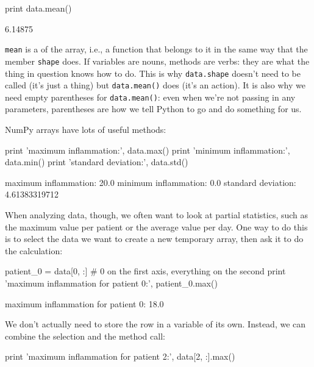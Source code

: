 \documentclass{book}
\begin{document}
\begin{VerbIn}
print data.mean()
\end{VerbIn}

\begin{VerbOut}
6.14875
\end{VerbOut}

\texttt{mean} is a  of the array, i.e., a
function that belongs to it in the same way that the member
\texttt{shape} does. If variables are nouns, methods are verbs: they are
what the thing in question knows how to do. This is why
\texttt{data.shape} doesn't need to be called (it's just a thing) but
\texttt{data.mean()} does (it's an action). It is also why we need empty
parentheses for \texttt{data.mean()}: even when we're not passing in any
parameters, parentheses are how we tell Python to go and do something
for us.

NumPy arrays have lots of useful methods:

\begin{VerbIn}
print 'maximum inflammation:', data.max()
print 'minimum inflammation:', data.min()
print 'standard deviation:', data.std()
\end{VerbIn}

\begin{VerbOut}
maximum inflammation: 20.0
minimum inflammation: 0.0
standard deviation: 4.61383319712
\end{VerbOut}

When analyzing data, though, we often want to look at partial
statistics, such as the maximum value per patient or the average value
per day. One way to do this is to select the data we want to create a
new temporary array, then ask it to do the calculation:

\begin{VerbIn}
patient_0 = data[0, :] # 0 on the first axis, everything on the second
print 'maximum inflammation for patient 0:', patient_0.max()
\end{VerbIn}

\begin{VerbOut}
maximum inflammation for patient 0: 18.0
\end{VerbOut}

We don't actually need to store the row in a variable of its own.
Instead, we can combine the selection and the method call:

\begin{VerbIn}
print 'maximum inflammation for patient 2:', data[2, :].max()
\end{VerbIn}
\end{document}
